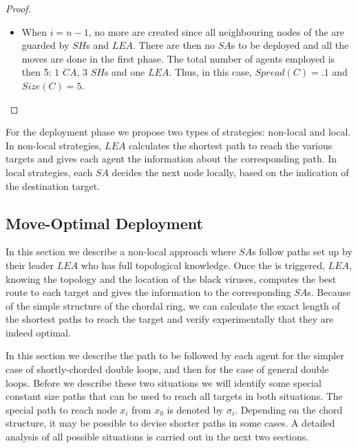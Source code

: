 \begin{proof}
\begin{itemize}
\begin{itemize}
\item When $i=n-1$, 
no more \bvs are created  since all neighbouring nodes of the \bv  are guarded by $SH$s and $LEA$. There are then no $SA$s to be deployed and all the moves are done in the first phase. The total number of agents employed is then 5: $1$ $CA$, $3$ $SH$s and one $LEA$. Thus, in this case,  $Spread(C)=.1$ and $Size(C)=5$.

\end{itemize}
\end{itemize}
\end{proof}




For the deployment phase we propose  two types of strategies: non-local and local. 
In   non-local strategies, $LEA$ calculates the shortest path to reach the various targets and gives each agent the information about the corresponding path. 
In local strategies, each $SA$ decides the next node locally, based on the indication of the destination target.
 


\subsection{Move-Optimal Deployment}



In this section we describe  a non-local approach where $SA$s follow paths set up by their leader $LEA$ who has full  topological knowledge. 
Once the \bv is triggered,  $LEA$, knowing the topology and the location of the black viruses, computes  the best route to each target and gives the information to the corresponding $SA$s.
Because of the simple structure of the chordal ring, we can calculate the exact length of the shortest paths to reach the target and verify experimentally that they are indeed optimal.

In this section we describe the path to be followed by each agent
%
for  the simpler case of   shortly-chorded double loops,  and  then for the    case of general double loops. 
 Before we describe these two situations  we will  identify  some special  constant size paths that can be used to reach all targets in both situations. The special path to reach node  $x_i$ from $x_0$ is denoted by $\sigma_i$.
Depending on the chord structure,  it may be possible to devise shorter paths in some cases. A detailed analysis of all possible situations is carried out in the next two sections.
 
